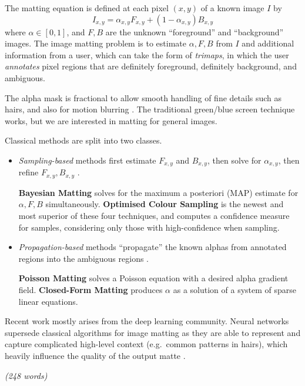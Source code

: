 \documentclass{article}
\begin{document}

The matting equation is defined at each pixel $(x,y)$ of a known image $I$ by
$$I_{x,y} = \alpha_{x,y} F_{x,y}  + (1-\alpha_{x,y}) B_{x,y}$$
where $\alpha\in[0,1]$, and $F,B$ are the unknown ``foreground'' and ``background'' images. The image matting problem is to estimate $\alpha,F,B$ from $I$ and additional information from a user, which can take the form of \emph{trimaps}, in which the user \emph{annotates} pixel regions that are
definitely foreground, definitely background, and ambiguous.


The alpha mask is fractional to allow smooth handling of fine details such as hairs, and also for motion blurring \cite{bayesian-matting}. The traditional green/blue screen technique works, but we are interested in matting for general images.

Classical methods are split into two classes.
\begin{itemize}
    \item \emph{Sampling-based} methods first estimate $F_{x,y}$ and $B_{x,y}$, then solve for $\alpha_{x,y}$, then refine $F_{x,y},B_{x,y}$ \cite{dim-paper}.

    \textbf{Bayesian Matting} \cite{bayesian-matting} solves for the maximum a posteriori (MAP) estimate for $\alpha,F,B$ simultaneously. \textbf{Optimised Colour Sampling} \cite{robust-matting} is the newest and most superior of these four techniques, and computes a confidence measure for samples, considering only those with high-confidence when sampling.
    \item \emph{Propagation-based} methods ``propagate'' the known alphas from annotated regions into the ambiguous regions \cite{dim-paper}.

    \textbf{Poisson Matting} \cite{poisson-matting} solves a Poisson equation with a desired alpha gradient field. \textbf{Closed-Form Matting} \cite{closed-form-matting} produces $\alpha$ as a solution of a system of sparse linear equations.
\end{itemize}

Recent work mostly arises from the deep learning community. Neural networks supersede classical algorithms for image matting as they are able to  represent and capture complicated high-level context (e.g.\ common patterns in hairs), which heavily influence the quality of the output matte \cite{sota-composition-1k}.

\emph{(248 words)}

%
\end{document}
